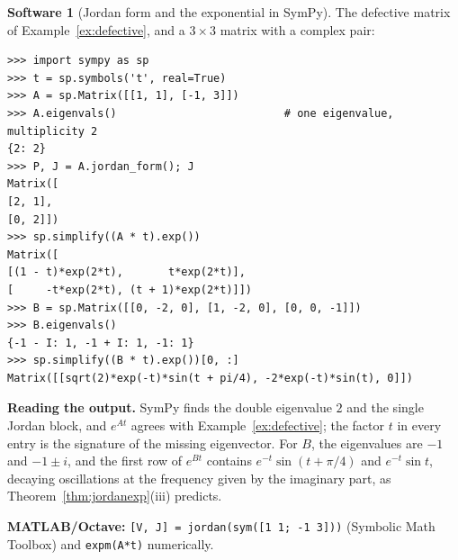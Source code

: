 \documentclass[11pt,a4paper]{article}
\numberwithin{equation}{section}
\theoremstyle{definition}
\newtheorem{software}[thm]{Software}
\begin{document}
\begin{software}[Jordan form and the exponential in SymPy]
\label{sw:jordan}
The defective matrix of Example~\ref{ex:defective}, and a $3 \times 3$ matrix with a complex pair:
{\small\begin{verbatim}
>>> import sympy as sp
>>> t = sp.symbols('t', real=True)
>>> A = sp.Matrix([[1, 1], [-1, 3]])
>>> A.eigenvals()                          # one eigenvalue, multiplicity 2
{2: 2}
>>> P, J = A.jordan_form(); J
Matrix([
[2, 1],
[0, 2]])
>>> sp.simplify((A * t).exp())
Matrix([
[(1 - t)*exp(2*t),       t*exp(2*t)],
[     -t*exp(2*t), (t + 1)*exp(2*t)]])
>>> B = sp.Matrix([[0, -2, 0], [1, -2, 0], [0, 0, -1]])
>>> B.eigenvals()
{-1 - I: 1, -1 + I: 1, -1: 1}
>>> sp.simplify((B * t).exp())[0, :]
Matrix([[sqrt(2)*exp(-t)*sin(t + pi/4), -2*exp(-t)*sin(t), 0]])
\end{verbatim}}
\textbf{Reading the output.} SymPy finds the double eigenvalue $2$ and the single Jordan block, and $e^{At}$ agrees with Example~\ref{ex:defective}; the factor $t$ in every entry is the signature of the
missing eigenvector. For $B$, the eigenvalues are $-1$ and $-1 \pm i$, and the first row of $e^{Bt}$ contains $e^{-t}\sin(t + \pi/4)$ and $e^{-t}\sin t$, decaying oscillations at the frequency given by the
imaginary part, as Theorem~\ref{thm:jordanexp}(iii) predicts.

\textbf{MATLAB/Octave:} \texttt{[V, J] = jordan(sym([1 1; -1 3]))} (Symbolic Math Toolbox) and \texttt{expm(A*t)} numerically.
\end{software}
\end{document}
